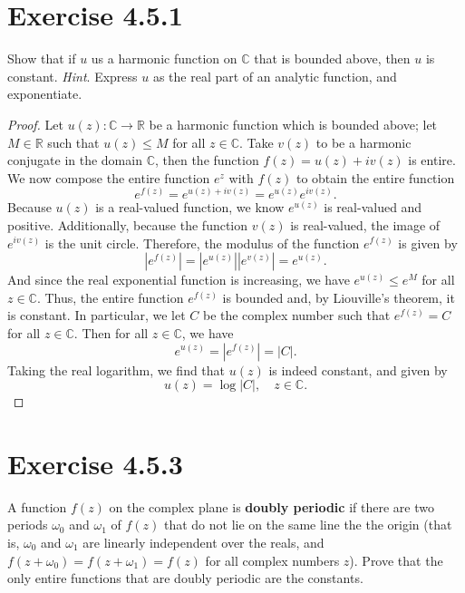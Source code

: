 \documentclass[12pt]{article}
\newenvironment{problem}
    {\begin{lrbox}{\mybox}\begin{minipage}{0.98\textwidth}}
    {\end{minipage}\end{lrbox}\framebox[\textwidth]{\usebox{\mybox}}}
\newcommand{\R}{\mathbb{R}} %
\newcommand{\C}{\mathbb{C}} %
\newcommand{\<}{\left\langle} %
\renewcommand{\>}{\right\rangle} %
\begin{document}
\newpage
\section{Exercise 4.5.1}
\begin{problem}
    Show that if $u$ us a harmonic function on $\C$ that is bounded above, then $u$ is constant. \emph{Hint}. Express $u$ as the real part of an analytic function, and exponentiate.
\end{problem}

\begin{proof}
    Let $u(z) : \C \to \R$ be a harmonic function which is bounded above; let $M \in\R$ such that $u(z) \leq M$ for all $z \in \C$. Take $v(z)$ to be a harmonic conjugate in the domain $\C$, then the function $f(z) = u(z) + iv(z)$ is entire. We now compose the entire function $e^z$ with $f(z)$ to obtain the entire function
    \[
        e^{f(z)} = e^{u(z) + iv(z)} = e^{u(z)}e^{i v(z)}.
    \]
    Because $u(z)$ is a real-valued function, we know $e^{u(z)}$ is real-valued and positive. Additionally, because the function $v(z)$ is real-valued, the image of $e^{iv(z)}$ is the unit circle. Therefore, the modulus of the function $e^{f(z)}$ is given by
    \[
        \left| e^{f(z)} \right| = \left| e^{u(z)} \right| \left| e^{v(z)} \right| = e^{u(z)}.
    \]
    And since the real exponential function is increasing, we have $e^{u(z)} \leq e^M$ for all $z \in \C$. Thus, the entire function $e^{f(z)}$ is bounded and, by Liouville's theorem, it is constant. In particular, we let $C$ be the complex number such that $e^{f(z)} = C$ for all $z \in \C$. Then for all $z \in \C$, we have
    \[e^{u(z)} = \left| e^{f(z)} \right| = |C|.\]
    Taking the real logarithm, we find that $u(z)$ is indeed constant, and given by
    \[u(z) = \log |C|, \quad z \in \C.\]
    
\end{proof}

\newpage
\section{Exercise 4.5.3}
\begin{problem}
    A function $f(z)$ on the complex plane is \textbf{doubly periodic} if there are two periods $\omega_0$ and $\omega_1$ of $f(z)$ that do not lie on the same line the the origin (that is, $\omega_0$ and $\omega_1$ are linearly independent over the reals, and $f(z + \omega_0) = f(z + \omega_1) = f(z)$ for all complex numbers $z$). Prove that the only entire functions that are doubly periodic are the constants.
\end{problem}
\end{document}
